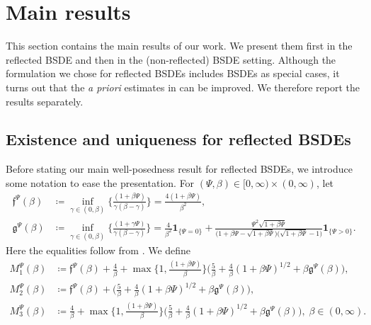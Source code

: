 \documentclass[10pt]{article} %
\newcommand\ff{\mathfrak f}
\newcommand\fg{\mathfrak g}
\newcommand{\1}{\mathbf{1}}
\begin{document}
\section{Main results}\label{sec::main_results}

This section contains the main results of our work. We present them first in the reflected BSDE and then in the (non-reflected) BSDE setting. Although the formulation we chose for reflected BSDEs includes BSDEs as special cases, it turns out that the \emph{a priori} estimates in  can be improved. We therefore report the results separately.

\subsection{Existence and uniqueness for reflected BSDEs}\label{sec::main_results_rbsde}

Before stating our main well-posedness result for reflected BSDEs, we introduce some notation to ease the presentation. For $(\Psi,\beta) \in [0,\infty) \times (0,\infty)$, let
\begin{align*}
	\ff^\Psi(\beta) &\coloneqq \inf_{\gamma\in (0,\beta)} \bigg\{\frac{(1+\beta\Psi)}{\gamma(\beta-\gamma)}\bigg\} = \frac{4(1+\beta\Psi)}{\beta^2},\\
	\fg^\Psi(\beta) &\coloneqq \inf_{\gamma \in (0,\beta)} \bigg\{ \frac{(1+\gamma\Psi)}{\gamma(\beta-\gamma)}\bigg\} = \frac{4}{\beta^2}\1_{\{\Psi = 0\}} + \frac{\Psi^2  \sqrt{1+\beta\Psi}}{\big(1+\beta\Psi -\sqrt{1+\beta\Psi}\big)\big(\sqrt{1+\beta\Psi}-1\big)}\1_{\{\Psi > 0\}}.
\end{align*}
Here the equalities follow from . We define
\begin{align*}
	M_1^\Psi(\beta) &\coloneqq \ff^\Psi(\beta) + \frac{4}{\beta} + \max\bigg\{1,\frac{(1+\beta\Psi)}{\beta}\bigg\}\bigg(\frac{5}{\beta} +\frac{4}{\beta}(1+\beta\Psi)^{1/2} + \beta \fg^\Psi(\beta)\bigg),\\ M_2^\Psi (\beta)&\coloneqq \ff^\Psi(\beta) + \bigg( \frac{5}{\beta} + \frac{4}{\beta}(1+\beta\Psi)^{1/2} + \beta \fg^\Psi(\beta) \bigg), \\
	M_3^\Psi (\beta) &\coloneqq \frac{4}{\beta} + \max\bigg\{1,\frac{(1+\beta\Psi)}{\beta}\bigg\}\bigg(\frac{5}{\beta} +\frac{4}{\beta}(1+\beta\Psi)^{1/2} + \beta \fg^\Psi(\beta)\bigg),\; \beta \in (0,\infty).
\end{align*}
\end{document}
